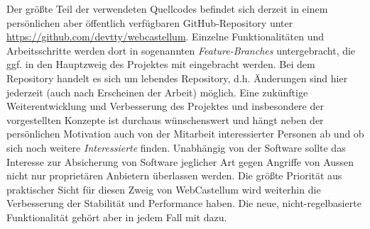 Der größte Teil der verwendeten Quellcodes befindet sich derzeit in einem persönlichen aber öffentlich verfügbaren GitHub-Repository unter \url{https://github.com/devtty/webcastellum}. Einzelne Funktionalitäten und Arbeitsschritte werden dort in sogenannten \emph{Feature-Branches} untergebracht, die ggf. in den Hauptzweig des Projektes mit eingebracht werden. Bei dem Repository handelt es sich um lebendes Repository, d.h. Änderungen sind hier jederzeit (auch nach Erscheinen der Arbeit) möglich. Eine zukünftige Weiterentwicklung und Verbesserung des Projektes und insbesondere der vorgestellten Konzepte ist durchaus wünschenswert und hängt neben der persönlichen Motivation auch von der Mitarbeit interessierter Personen ab und ob sich noch weitere \emph{Interessierte} finden. Unabhängig von der Software sollte das Interesse zur Absicherung von Software jeglicher Art gegen Angriffe von Aussen nicht nur proprietären Anbietern überlassen werden. Die größte Priorität aus praktischer Sicht für diesen Zweig von WebCastellum wird weiterhin die Verbesserung der Stabilität und Performance haben. Die neue, nicht-regelbasierte Funktionalität gehört aber in jedem Fall mit dazu.
